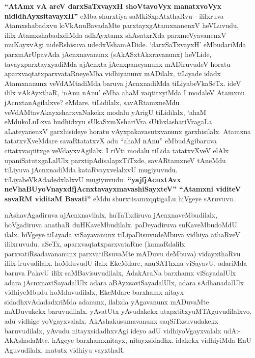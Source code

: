 \begin{artha}
\textbf{``AtAmx vA areV darxSaTxvayxH shoVtavoVyx manatxvoVyx nididhAyxsitavayxH''} eMba shurxtiya saMkiSxpAtxthaRvu -
ililxruva Atamxshabadxvu loVkAnuBavadaMte parxtayxgAtamxnanenxV
heVLuvudu, ililx AtamxshabadxdiMda adhAyxtamx shAsatxrXda
parxmeVyavanenxV muKayxvAgi nideRshisuva udedxVshamADide. `darxSaTxvayxH'
eMbudariMda parxmArUpavAda jAcnxnavanunx  (sAkASxtAkxravanunx) heVLide,
tavayxparxtayxyadiMda ajAcnxta jAcnxpaneyanunx mADiruvudeV
horatu aparxvaqtatxparxvataRneyeMba vidhiyanunx mADilalx, tiLiyade
idadx Atamxnanunx veVdAMtadiMda baruva jAcnxnadiMda
tiLiyabeVkaSeTx. ideV ililx vAkAyxthaR, `nAnu nAnu' eMba ahaM
vaqtitxyiMda I modaleV Atamxnu jAcnxtanAgilalxve? eMdare. tiLidilalx,
savARtamxneMdu veVdAMtavAkayxsharxvaNakekx modalu yArigU tiLidilalx,
`ahaM eMdukoLuLxva budhidxyu sUkaSxmXshariVra sUthxlashariVragaLa
aLateyanenxV garxhisideye horatu vAyxpakavasutxvanunx
garxhisilalx. Atamxna tatatxvXveMdare savaRtatatxvX adu ``ahaM nAnu''
eMbudAgibaruva citatxvaqtitxge veVdayxvAgilalx. I riVti
modalu tiLida tatatxvXveV elAlx upaniSatutxgaLalUlx
parxtipAdisalapxTiTxde, savARtamxneV tAneMdu tiLiyuva jAcnxnadiMda
kataRvayxvelalxvU mugiyuvudu. tiLiyabeVkAdadedxlalxvU mugiyuvudu.
\textbf{``yajfjAcnxtAvx neVhaBUyoV\s nayxdfjAcnxtavayxmavashiSayxteV'' ``Atamxni viditeV savaRM viditaM Bavati''} eMdu shurxtisamxqqtigaLu hiVgeye sAruvuvu.
\end{artha}

\centerline{}

\begin{artha}
nAshavAgadiruva ajAcnxnavilalx, huTaTxdiruva jAcnxnaveMbudilalx,
hoVgadiruva  anathaR duHKaveMbudilalx. paDeyadiruva
suKaveMbudoMdU ilalx. hiVgeye tiLiyada viSayavanunx tiLipaDisuvudeMbuva
vidhiya athaRveV ililxruvudu. aSeTx, aparxvaqtatxparxvataRne
(kamaRdalilx parxvatiRsadavananunx parxvatiRsuvaMte mADuvu deMbuva)
vidayxthaRvu ililx iruvudilalx. hoMduvudU ilalx EkeMdare, anuSAThxna
viSayavU, adariMda baruva PalavU ililx saMBavisuvudilalx, AdakAraNa
barxhamx viSayadalUlx adara jAcnxnaviSayadalUlx adara
aBAyxsaviSayadalUlx, adara \-sAdhanadalUlx vidhiyeMbudu hoMduvudilalx,
EkeMdare barxhamx nitayx sidadhxvAdadadxriMda adanunx, ilalxda
yAgavanunx mADuvaMte mADuvukekx baruvudilalx. yAvatUtx  yAvudakekx
utapxtitxyuMTAguvudilalxvo, adu vidhige yoVgayxvalalx.
AkAshakusumavanunx saqSiTxsuvudakekx baruvudilalx, yAvudu
nitayxsidadhxvAgi ideyo adU vidhiyoVgayxvalalx udA:- AkAshadaMte.
hAgeye barxhamxnitayx, nitayxsidadhx. idakekx vidhiyiMda EnU
Aguvudilalx, matutx vidhiyu vayxthaR. 
\end{artha}

